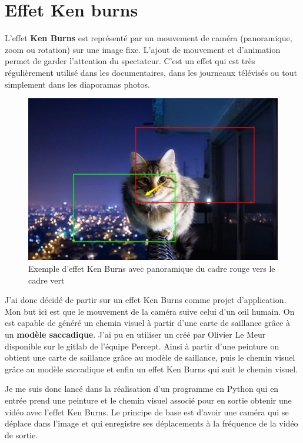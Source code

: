 \newpage
\section{Effet Ken burns}

\par
L'effet \textbf{Ken Burns} est représenté par un mouvement de caméra (panoramique, zoom ou rotation) sur une image fixe. L'ajout de mouvement et d'animation permet de garder l'attention du spectateur. C'est un effet qui est très régulièrement utilisé dans les documentaires, dans les journeaux télévisés ou tout simplement dans les diaporamas photos. 

\begin{figure}[ht]
    \centering
    \includegraphics[width=0.7\linewidth]{datas/kenburnseffect.jpg}
    \caption{Exemple d'effet Ken Burns avec panoramique du cadre rouge vers le cadre vert}
    \label{kenburnsexemple}
\end{figure}

\par
J'ai donc décidé de partir sur un effet Ken Burns comme projet d'application. Mon but ici est que le mouvement de la caméra suive celui d'un \oe{}il humain. On est capable de généré un chemin visuel à partir d'une carte de saillance grâce à un \textbf{modèle saccadique}. J'ai pu en utiliser un créé par Olivier Le Meur \cite{saccadicmodel} disponible sur le gitlab de l'équipe Percept. Ainsi à partir d'une peinture on obtient une carte de saillance grâce au modèle de saillance, puis le chemin visuel grâce au modèle saccadique et enfin un effet Ken Burns qui suit le chemin visuel.

\par
Je me suis donc lancé dans la réalisation d'un programme en Python qui en entrée prend une peinture et le chemin visuel associé pour en sortie obtenir une vidéo avec l'effet Ken Burns. Le principe de base est d'avoir une caméra qui se déplace dans l'image et qui enregistre ses déplacements à la fréquence de la vidéo de sortie.

